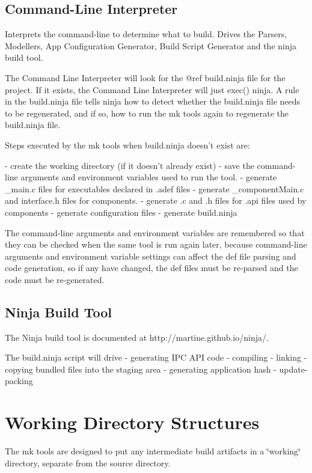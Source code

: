 \hypertarget{mkToolsDesign_mkToolsDesign_commandLineInterpreter}{}\subsection{Command-\/\+Line Interpreter}\label{mkToolsDesign_mkToolsDesign_commandLineInterpreter}
\begin{DoxyVerb}Interprets the command-line to determine what to build.
Drives the Parsers, Modellers, App Configuration Generator, Build Script Generator and
the ninja build tool.

The Command Line Interpreter will look for the @ref build.ninja file for the project.
If it exists, the Command Line Interpreter will just exec() ninja.  A rule in the
build.ninja file tells ninja how to detect whether the build.ninja file needs to be
regenerated, and if so, how to run the mk tools again to regenerate the build.ninja file.

Steps executed by the mk tools when build.ninja doesn't exist are:

 - create the working directory (if it doesn't already exist)
 - save the command-line arguments and environment variables used to run the tool.
 - generate _main.c files for executables declared in .adef files
 - generate _componentMain.c and interface.h files for components.
 - generate .c and .h files for .api files used by components
 - generate configuration files
 - generate build.ninja

The command-line arguments and environment variables are remembered so that they can
be checked when the same tool is run again later, because command-line arguments and
environment variable settings can affect the def file parsing and code generation, so
if any have changed, the def files must be re-parsed and the code must be re-generated.
\end{DoxyVerb}
\hypertarget{mkToolsDesign_mkToolsDesign_ninjaBuildTool}{}\subsection{Ninja Build Tool}\label{mkToolsDesign_mkToolsDesign_ninjaBuildTool}
\begin{DoxyVerb}The Ninja build tool is documented at http://martine.github.io/ninja/.

The build.ninja script will drive
 - generating IPC API code
 - compiling
 - linking
 - copying bundled files into the staging area
 - generating application hash
 - update-packing
\end{DoxyVerb}
\hypertarget{mkToolsDesign_mkToolsDesign_workingDirs}{}\section{Working Directory Structures}\label{mkToolsDesign_mkToolsDesign_workingDirs}
The mk tools are designed to put any intermediate build artifacts in a \char`\"{}working\char`\"{} directory, separate from the source directory.

